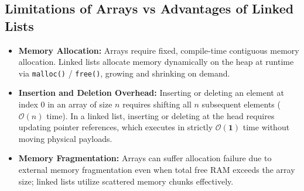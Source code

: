 \documentclass[12pt,a4paper]{article}
\begin{document}
\subsection{Limitations of Arrays vs Advantages of Linked Lists}
\begin{itemize}[leftmargin=*, itemsep=3pt]
  \item \textbf{Memory Allocation:} Arrays require fixed, compile-time contiguous memory allocation. Linked lists allocate memory dynamically on the heap at runtime via \texttt{malloc()} / \texttt{free()}, growing and shrinking on demand.
  \item \textbf{Insertion and Deletion Overhead:} Inserting or deleting an element at index $0$ in an array of size $n$ requires shifting all $n$ subsequent elements ($\mathcal{O}(n)$ time). In a linked list, inserting or deleting at the head requires updating pointer references, which executes in strictly $\mathbf{\mathcal{O}(1)}$ time without moving physical payloads.
  \item \textbf{Memory Fragmentation:} Arrays can suffer allocation failure due to external memory fragmentation even when total free RAM exceeds the array size; linked lists utilize scattered memory chunks effectively.
\end{itemize}

\begin{tcolorbox}[tikzbox, title={\textbf{Memory Representation and Pointer Rewiring in a Singly Linked List}}]
\centering
{}
\end{tcolorbox}
\end{document}
